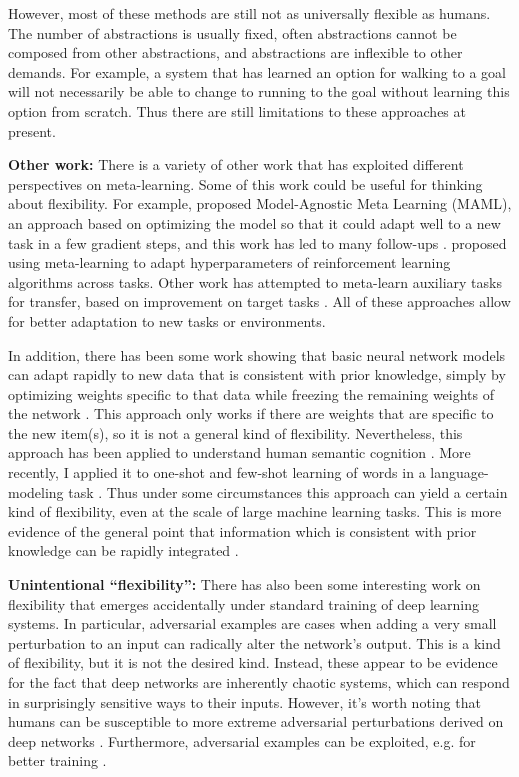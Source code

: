However, most of these methods are still not as universally flexible as humans. The number of abstractions is usually fixed, often abstractions cannot be composed from other abstractions, and abstractions are inflexible to other demands. For example, a system that has learned an option for walking to a goal will not necessarily be able to change to running to the goal without learning this option from scratch. Thus there are still limitations to these approaches at present. \par 
\textbf{Other work:} There is a variety of other work that has exploited different perspectives on meta-learning. Some of this work could be useful for thinking about flexibility. For example, \citet{Finn2017a} proposed Model-Agnostic Meta Learning (MAML), an approach based on optimizing the model so that it could adapt well to a new task in a few gradient steps, and this work has led to many follow-ups \citep[e.g.][]{Finn2017, Finn2018, Nichol2018}. \citet{Xu2018} proposed using meta-learning to adapt hyperparameters of reinforcement learning algorithms across tasks. Other work has attempted to meta-learn auxiliary tasks for transfer, based on improvement on target tasks \citep{Liu2019a}. All of these approaches allow for better adaptation to new tasks or environments. \par
In addition, there has been some work showing that basic neural network models can adapt rapidly to new data that is consistent with prior knowledge, simply by optimizing weights specific to that data while freezing the remaining weights of the network \citep{Rumelhart1993}. This approach only works if there are weights that are specific to the new item(s), so it is not a general kind of flexibility. Nevertheless, this approach has been applied to understand human semantic cognition \citep{Rogers2004}. More recently, I applied it to one-shot and few-shot learning of words in a language-modeling task \citep{Lampinen2018a}. Thus under some circumstances this approach can yield a certain kind of flexibility, even at the scale of large machine learning tasks. This is more evidence of the general point that information which is consistent with prior knowledge can be rapidly integrated \citep{McClelland2013}. \par 
\textbf{Unintentional ``flexibility'':} There has also been some interesting work on flexibility that emerges accidentally under standard training of deep learning systems. In particular, adversarial examples \citep{SzegedyAdv} are cases when adding a very small perturbation to an input can radically alter the network's output. This is a kind of flexibility, but it is not the desired kind. Instead, these appear to be evidence for the fact that deep networks are inherently chaotic systems, which can respond in surprisingly sensitive ways to their inputs. However, it's worth noting that humans can be susceptible to more extreme adversarial perturbations derived on deep networks \citep{Elsayed2018}. Furthermore, adversarial examples can be exploited, e.g. for better training \citep{Goodfellow2015}. \par 
